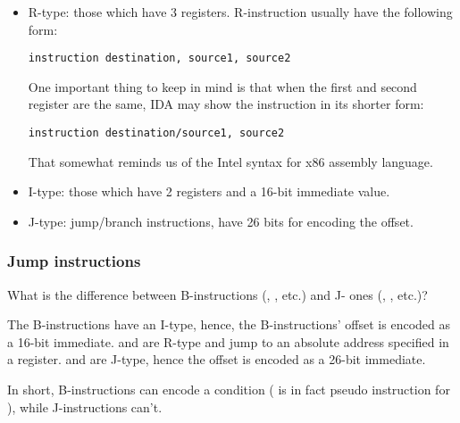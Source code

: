 \begin{itemize}

\item R-type: those which have 3 registers. R-instruction usually have the following form:

\begin{lstlisting}
instruction destination, source1, source2
\end{lstlisting}

One important thing to keep in mind is that when the first and second register are the same, 
IDA may show the instruction in its shorter form:

\begin{lstlisting}
instruction destination/source1, source2
\end{lstlisting}

That somewhat reminds us of the Intel syntax for x86 assembly language.

\item I-type: those which have 2 registers and a 16-bit immediate value.

\item J-type: jump/branch instructions, have 26 bits for encoding the offset.

\end{itemize}

\subsubsection{Jump instructions}

What is the difference between B-instructions (, , etc.) and J- ones (, , etc.)?

The B-instructions have an I-type, hence, the B-instructions' offset is encoded as a 16-bit immediate.
 and  are R-type and jump to an absolute address specified in a register.
 and  are J-type, hence the offset is encoded as a 26-bit immediate.

In short, B-instructions can encode a condition 
( is in fact pseudo instruction for ), 
while J-instructions can't.

